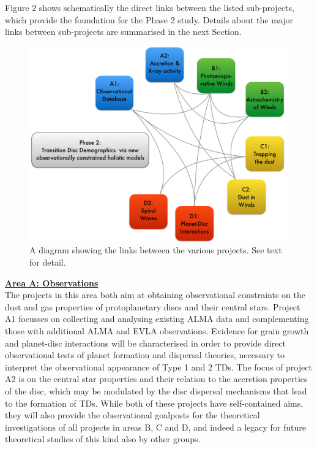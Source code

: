 \documentclass[12pt]{article}
\begin{document}
Figure 2 shows schematically the direct links between the listed sub-projects, which provide the foundation for the Phase 2 study. Details about the major links between sub-projects are summarised in the next Section. 

\begin{figure}
\centerline{\includegraphics[width=13cm]{dependency2.jpg}}
\caption{A diagram showing the links between the various
projects. See text for detail.}

\end{figure}

\vspace{1.0em}


%
\noindent\underline{{\bf Area A: Observations}}\\
\noindent The projects in this area both aim at obtaining
observational constraints on the dust and gas properties of
protoplanetary discs and their central stars. Project A1 focusses on
collecting and analysing existing ALMA data and complementing those
with additional ALMA and EVLA observations. Evidence for grain growth
and planet-disc interactions will be characterised in order to provide
direct observational tests of planet formation and dispersal theories,
necessary to interpret the observational appearance of Type 1 and 2
TDs. The focus of project A2 is on the central star properties and
their relation to the accretion properties of the disc, which may be
modulated by the disc dispersal mechanisms that lead to the formation
of TDs. While both of these projects have self-contained aims, they
will also provide the observational goalposts for the theoretical
investigations of all projects in areas B, C and D, and indeed a
legacy for future theoretical studies of this kind also by other
groups.    \\ 
\end{document}
